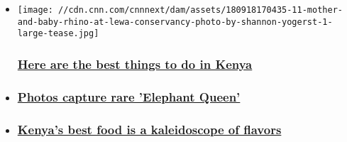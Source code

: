 \begin{itemize}
\item
  \href{/travel/article/kenya-things-to-do/index.html}{}

  \texttt{[image: //cdn.cnn.com/cnnnext/dam/assets/180918170435-11-mother-and-baby-rhino-at-lewa-conservancy-photo-by-shannon-yogerst-1-large-tease.jpg]}

  \hypertarget{here-are-the-best-things-to-do-in-kenya}{%
  \subsubsection{\texorpdfstring{\href{/travel/article/kenya-things-to-do/index.html}{Here
  are the best things to do in
  Kenya}}{Here are the best things to do in Kenya}}\label{here-are-the-best-things-to-do-in-kenya}}
\item
  \hypertarget{photos-capture-rare-elephant-queen}{%
  \subsubsection{\texorpdfstring{\href{/travel/article/rare-elephant-pictures-kenya/index.html}{Photos
  capture rare 'Elephant
  Queen'}}{Photos capture rare 'Elephant Queen'}}\label{photos-capture-rare-elephant-queen}}
\item
  \hypertarget{kenyas-best-food-is-a-kaleidoscope-of-flavors}{%
  \subsubsection{\texorpdfstring{\href{/travel/article/kenyan-food-dishes/index.html}{Kenya's
  best food is a kaleidoscope of
  flavors}}{Kenya's best food is a kaleidoscope of flavors}}\label{kenyas-best-food-is-a-kaleidoscope-of-flavors}}
\end{itemize}

